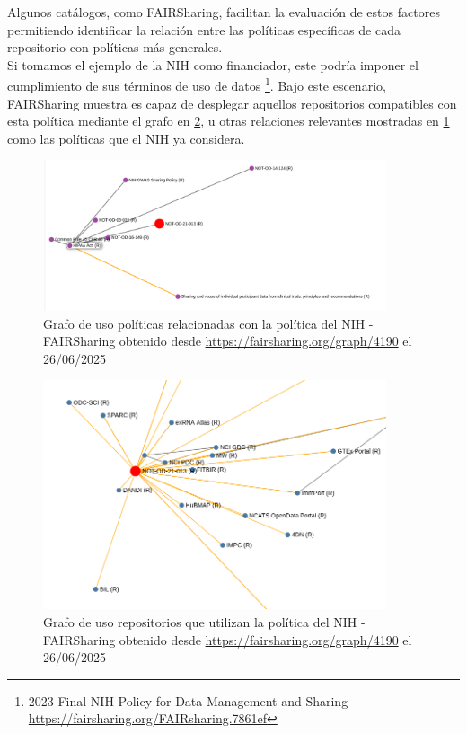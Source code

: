 \documentclass[runningheads]{llncs}
\begin{document}

Algunos catálogos, como FAIRSharing, facilitan la evaluación de estos factores permitiendo identificar la relación entre las políticas específicas de cada repositorio con políticas más generales.\\
Si tomamos el ejemplo de la NIH como financiador, este podría imponer el cumplimiento de sus términos de uso de datos \footnote{\label{nih_policy_fairsharing} 2023 Final NIH Policy for Data Management and Sharing - \url{https://fairsharing.org/FAIRsharing.7861ef}}. Bajo este escenario, FAIRSharing muestra es capaz de desplegar aquellos repositorios compatibles con esta política mediante el grafo en \ref{fairsharing_nih_policy_repo_usages}, u otras relaciones relevantes mostradas en \ref{fairsharing_nih_policy_relations} como las políticas que el NIH ya considera.

\begin{figure}[h]
    \includegraphics[width=0.9\textwidth]{img/FAIRSharing_NIHPol_relations.png}
    \caption{
    Grafo de uso políticas relacionadas con la política del NIH
    - FAIRSharing obtenido desde \url{https://fairsharing.org/graph/4190} el 26/06/2025
    }
    \label{fairsharing_nih_policy_relations}
\end{figure}
\begin{figure}[h]
    \includegraphics[width=0.9\textwidth]{img/FAIRSharing_NIHPol_Repos.png}
    \caption{
    Grafo de uso repositorios que utilizan la política del NIH
    - FAIRSharing obtenido desde \url{https://fairsharing.org/graph/4190} el 26/06/2025
    }
    \label{fairsharing_nih_policy_repo_usages}
\end{figure}
\end{document}
